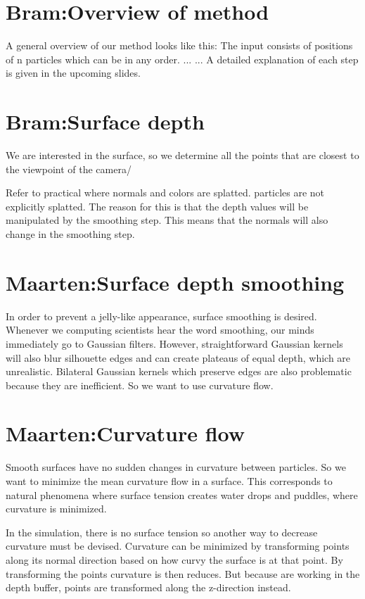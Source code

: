 \documentclass{article}
\begin{document}
\section{Bram:Overview of method}
A general overview of our method looks like this:
The input consists of positions of n particles which can be in any order.
...
...
A detailed explanation of each step is given in the upcoming slides.

\section{Bram:Surface depth}
We are interested in the surface, so we determine all the points that are closest to the viewpoint of the camera/

Refer to practical where normals and colors are splatted.
particles are not explicitly splatted.
The reason for this is that the depth values will be manipulated by the smoothing step.
This means that the normals will also change in the smoothing step.

\section{Maarten:Surface depth smoothing} %
\label{sec:_surface_depth_smoothing}
In order to prevent a jelly-like appearance, surface smoothing is desired.
Whenever we computing scientists hear the word smoothing, our minds immediately go to Gaussian filters.
However, straightforward Gaussian kernels will also blur silhouette edges and can create plateaus of equal depth, which are unrealistic.
Bilateral Gaussian kernels which preserve edges are also problematic because they are inefficient.
So we want to use curvature flow.

\section{Maarten:Curvature flow} %
\label{sec:_curvature_flow}
Smooth surfaces have no sudden changes in curvature between particles. 
So we want to minimize the mean curvature flow in a surface.
This corresponds to natural phenomena where surface tension creates water drops and puddles, where curvature is minimized.

In the simulation, there is no surface tension so another way to decrease curvature must be devised.
Curvature can be minimized by transforming points along its normal direction based on how curvy the surface is at that point. By transforming the points curvature is then reduces. But because are working in the depth buffer, points are transformed along the z-direction instead.
\end{document}
